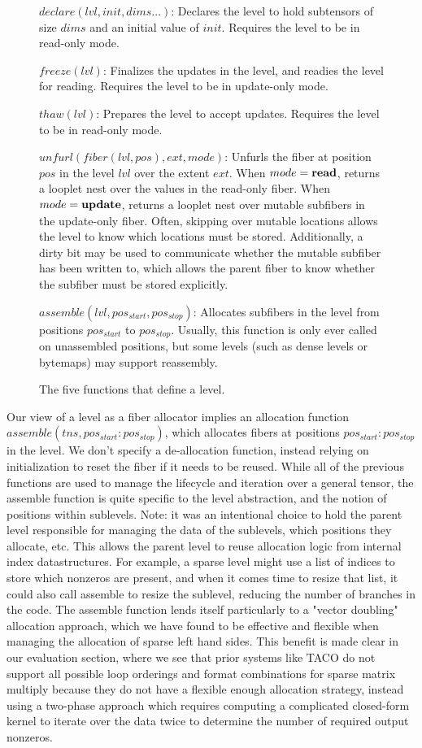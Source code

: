 \begin{figure}[htbp]
    \footnotesize
    \raggedright
$declare(lvl, init, dims...)$: Declares the level to hold subtensors
of size $dims$ and an initial value of $init$. Requires the level to be in
read-only mode.

$freeze(lvl)$: Finalizes the updates in the level, and readies the
level for reading. Requires the level to be in update-only mode.

$thaw(lvl)$: Prepares the level to accept updates. Requires the level
to be in read-only mode.

$unfurl(fiber(lvl, pos), ext, mode)$: Unfurls the fiber at position
$pos$ in the level $lvl$ over the extent $ext$. When $mode = \text{\textbf{read}}$,
returns a looplet nest over the values in the read-only fiber.  When $mode =
\text{\textbf{update}}$, returns a looplet nest over mutable subfibers in the update-only
fiber. Often, skipping over mutable locations allows the level to know which
locations must be stored. Additionally, a dirty bit may be used to communicate
whether the mutable subfiber has been written to, which allows the parent fiber
to know whether the subfiber must be stored explicitly.

$assemble(lvl, pos_{start}, pos_{stop})$: Allocates subfibers in the
level from positions $pos_{start}$ to $pos_{stop}$. Usually, this function is
only ever called on unassembled positions, but some levels (such as dense levels
or bytemaps) may support reassembly.
\caption{The five functions that define a level.}
\end{figure}


Our view of a level as a fiber allocator implies an allocation function
$assemble(tns, pos_{start}:pos_{stop})$, which allocates fibers at positions
$pos_{start}:pos_{stop}$ in the level. We don't specify a de-allocation
function, instead relying on initialization to reset the fiber if it needs to be
reused. While all of the previous functions are used to manage the lifecycle and
iteration over a general tensor, the assemble function is quite specific to the
level abstraction, and the notion of positions within sublevels. Note: it was an
intentional choice to hold the parent level responsible for managing the
data of the sublevels, which positions they allocate, etc. This allows the parent
level to reuse allocation logic from internal index datastructures. For example,
a sparse level might use a list of indices to store which nonzeros are present,
and when it comes time to resize that list, it could also call assemble to resize the
sublevel, reducing the number of branches in the code. The assemble function
lends itself particularly to a "vector doubling" allocation approach, which we
have found to be effective and flexible when managing the allocation
of sparse left hand sides. This benefit is made clear in our evaluation section,
where we see that prior systems like TACO do not support all possible loop
orderings and format combinations for sparse matrix multiply because they do
not have a flexible enough allocation strategy, instead using a two-phase approach
which requires computing a complicated closed-form kernel to iterate over the
data twice to determine the number of required output nonzeros.

